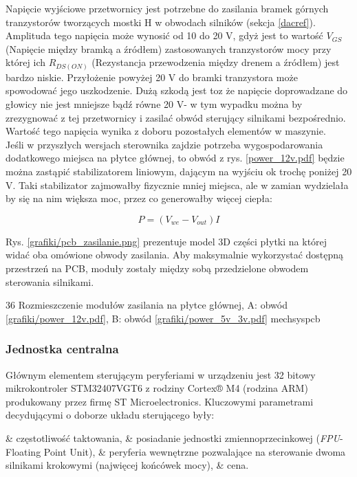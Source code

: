 Napięcie wyjściowe przetwornicy jest potrzebne do zasilania bramek górnych tranzystorów tworzących mostki H w obwodach silników (sekcja \ref{dacref}). Amplituda tego napięcia może wynosić od 10 do 20 V, gdyż jest to wartość $ V_{GS} $ (Napięcie między bramką a źródłem) zastosowanych tranzystorów mocy przy której ich $ R_{DS(ON)} $ (Rezystancja przewodzenia między drenem a źródłem) jest bardzo niskie. Przyłożenie powyżej 20 V do bramki tranzystora może spowodować jego uszkodzenie. Dużą szkodą jest toz że napięcie doprowadzane do głowicy nie jest mniejsze bądź równe 20 V- w tym wypadku można by zrezygnować z tej przetwornicy i zasilać obwód sterujący silnikami bezpośrednio. Wartość tego napięcia wynika z doboru pozostałych elementów w maszynie. \\

Jeśli w przyszłych wersjach sterownika zajdzie potrzeba wygospodarowania dodatkowego miejsca na płytce głównej, to obwód z rys. \ref{power_12v.pdf} będzie można zastąpić stabilizatorem liniowym, dającym na wyjściu ok trochę poniżej 20 V. Taki stabilizator zajmowałby fizycznie mniej miejsca, ale w zamian wydzielała by się na nim większa moc, przez co generowałby więcej ciepła:

\begin{equation} \label{eq:zasilanie1}
	P = (V_{we} - V_{out})I
\end{equation}

Rys. \ref{grafiki/pcb_zasilanie.png} prezentuje model 3D części płytki na której widać oba omówione obwody zasilania. Aby maksymalnie wykorzystać dostępną przestrzeń na PCB, moduły zostały między sobą przedzielone obwodem sterowania silnikami.

	{36}
	{Rozmieszczenie modułów zasilania na płytce głównej, A: obwód \ref{grafiki/power_12v.pdf}, B: obwód \ref{grafiki/power_5v_3v.pdf}}
	{mechsyspcb}
	
\subsubsection{Jednostka centralna}

Głównym elementem sterującym peryferiami w urządzeniu jest 32 bitowy mikrokontroler STM32407VGT6 z rodziny Cortex® M4 (rodzina ARM) produkowany przez firmę ST Microelectronics. Kluczowymi parametrami decydującymi o doborze układu sterującego były:

\begin{easylist}
	& częstotliwość taktowania,
	& posiadanie jednostki zmiennoprzecinkowej ({\it FPU}- Floating Point Unit),
	& peryferia wewnętrzne pozwalające na sterowanie dwoma silnikami krokowymi (najwięcej końcówek mocy),
	& cena.
	\\
\end{easylist} 

